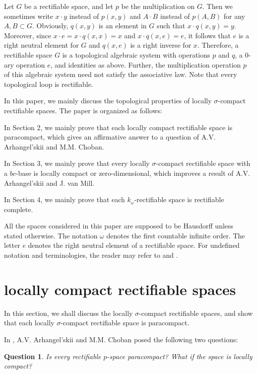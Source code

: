 \documentclass[psamsfonts,fceqn,leqno]{amsart}
\newtheorem{question}[theorem]{Question}
\theoremstyle{definition}
\begin{document}
Let $G$ be a rectifiable space, and let $p$ be the multiplication on
$G$. Then we sometimes write $x\cdot y$ instead of $p(x, y)$ and
$A\cdot B$ instead of $p(A, B)$ for any $A, B\subset G$. Obviously,
$q(x, y)$ is an element in $G$ such that $x\cdot q(x, y)=y$. Moreover, since $x\cdot
e=x\cdot q(x, x)=x$ and $x\cdot q(x, e)=e$, it follows that $e$ is a right neutral
element for $G$ and $q(x, e)$ is a right inverse for $x$. Therefore, a
rectifiable space $G$ is a topological algebraic system with
operations $p$ and $q$, a 0-ary operation $e$, and identities as above. Further, the multiplication operation $p$ of this algebraic system need not satisfy the
associative law. Note that
every topological loop is rectifiable.

In this paper, we mainly discuss the topological properties of locally $\sigma$-compact rectifiable spaces. The paper is organized as follows:

In Section 2, we mainly prove that each locally compact rectifiable space is paracompact, which gives an affirmative answer to a question of A.V. Arhangel'skii and M.M. Choban.

In Section 3, we mainly prove that every locally $\sigma$-compact rectifiable space with a $bc$-base is
locally compact or zero-dimensional, which improves a result of A.V. Arhangel'skii and J. van Mill.

In Section 4, we mainly prove that each $k_{\omega}$-rectifiable space is rectifiable complete.

All the spaces considered in this paper are supposed to be Hausdorff unless stated otherwise.
The notation $\omega$ denotes the first countable infinite order. The letter $e$
denotes the right neutral element
of a rectifiable space. For undefined notation and terminologies, the reader may refer to
\cite{A2008} and \cite{E1989}.

\section{locally compact rectifiable spaces}
In this section, we shall discuss the locally $\sigma$-compact rectifiable spaces, and  show that each locally $\sigma$-compact rectifiable space is paracompact. 

In \cite{A2009}, A.V. Arhangel'skii and M.M. Choban posed the following two questions:

\begin{question}\cite[Problem 5.9]{A2009}\label{q1}
Is every rectifiable $p$-space paracompact? What if the space is locally compact?
\end{question}
\end{document}
